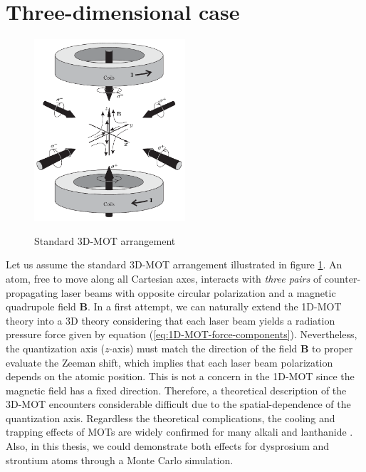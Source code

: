 %
\section{Three-dimensional case}
\label{sec:three-dimensional-MOT}
%
\begin{figure}[!ht]
	\centering
	\caption{Standard 3D-MOT arrangement}
	\includegraphics[width=0.5\textwidth]{USPSC-img/standard-3D-MOT-arrangement.png}
	\label{fig:standard-3D-MOT-arrangement}
	\vspace{-20pt}
\end{figure}

Let us assume the standard 3D-MOT arrangement illustrated in figure \ref{fig:standard-3D-MOT-arrangement}. An atom, free to move along all Cartesian axes, interacts with \textit{three pairs} of counter-propagating laser beams with opposite circular polarization and a magnetic quadrupole field $ \mathbf{B} $. In a first attempt, we can naturally extend the 1D-MOT theory into a 3D theory considering that each laser beam yields a radiation pressure force given by equation (\ref{eq:1D-MOT-force-components}). Nevertheless, the quantization axis ($z$-axis) must match the direction of the field $ \mathbf{B} $ to proper evaluate the Zeeman shift, which implies that each laser beam polarization depends on the atomic position. This is not a concern in the 1D-MOT since the magnetic field has a fixed direction. Therefore, a theoretical description of the 3D-MOT \cite{prudnikov2015three} encounters considerable difficult due to the spatial-dependence of the quantization axis. Regardless the theoretical complications, the cooling and trapping effects of MOTs are widely confirmed for many alkali \cite{raab1987trapping, katori1999magneto, zachorowski1998magneto} and lanthanide \cite{maier2014narrow, miyazawa2021narrow, frisch2012narrow}. Also, in this thesis, we could demonstrate both effects for dysprosium and strontium atoms through a Monte Carlo simulation.


